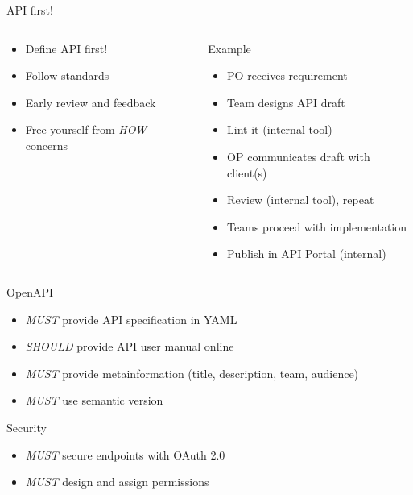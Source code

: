 \documentclass[10pt]{beamer}
\begin{document}
\begin{frame}{API first!}
  \begin{columns}
   	\begin{column}{0.4\textwidth}
	  \begin{itemize}
	    \item Define API first!
		\item Follow standards
		\item Early review and feedback
		\item Free yourself from \emph{HOW} concerns
	  \end{itemize}
   	\end{column}

    \begin{column}{0.6\textwidth}
      Example
      \begin{itemize}
        \item PO receives requirement
        \item Team designs API draft
        \item Lint it (internal tool)
        \item OP communicates draft with client(s)
        \item Review (internal tool), repeat
        \item Teams proceed with implementation
        \item Publish in API Portal (internal)
     	\end{itemize}
   \end{column}
  \end{columns}

\end{frame}

\begin{frame}{OpenAPI}
  \begin{itemize}
    \item \emph{MUST} provide API specification in YAML
    \item \emph{SHOULD} provide API user manual online
    \item \emph{MUST} provide metainformation (title, description, team, audience)
    \item \emph{MUST} use semantic version
  \end{itemize}
\end{frame}

\begin{frame}{Security}
  \begin{itemize}
    \item \emph{MUST} secure endpoints with OAuth 2.0
    \item \emph{MUST} design and assign permissions
  \end{itemize}
\end{frame}
\end{document}
